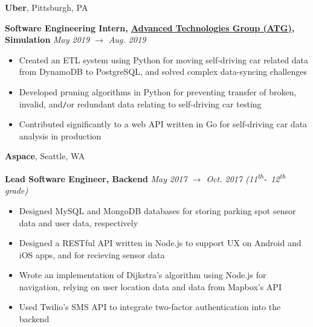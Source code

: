 \documentclass[10pt]{article}
\begin{document}
\begin{flushleft}
		\vspace{-1.50mm}
		\textbf{Uber}, Pittsburgh, PA\\
		\begin{leftli}
			{\small \textbf{Software Engineering Intern, \href{https://www.uber.com/us/en/atg/research-and-development/perception-and-prediction/}{Advanced Technologies Group (ATG)}, Simulation}} \hfill \textit{\small May 2019 $\rightarrow$ Aug. 2019}
			\begin{itemize}
				\item Created an ETL system using Python for moving self-driving car related data from DynamoDB to PostgreSQL, and solved complex data-syncing challenges
				\vspace{-2mm}
				\item Developed pruning algorithms in Python for preventing transfer of broken, invalid, and\texttt{/}or redundant data relating to self-driving car testing
				\vspace{-2mm}
				\item Contributed significantly to a web API written in Go for self-driving car data analysis in production
			\end{itemize}
		\end{leftli}

		\vspace{-1.50mm}
		\textbf{Aspace}, Seattle, WA\\
		\begin{leftli}
			{\small \textbf{Lead Software Engineer, Backend}} \hfill \textit{\small May 2017 $\rightarrow$ Oct. 2017 (11\textsuperscript{th}\texttt{-} 12\textsuperscript{th} grade)}

			\begin{itemize}
				\item Designed MySQL and MongoDB databases for storing parking spot sensor data and user data, respectively
				\vspace{-2mm}
				\item Designed a RESTful API written in Node.js to support UX on Android and iOS apps, and for recieving sensor data
				\vspace{-2mm}
				\item Wrote an implementation of Dijkstra's algorithm using Node.js for navigation, relying on user location data and data from Mapbox's API
				\vspace{-2mm}
				\item Used Twilio's SMS API to integrate two-factor authentication into the backend
			\end{itemize}
		\end{leftli}


\end{flushleft}
\end{document}
